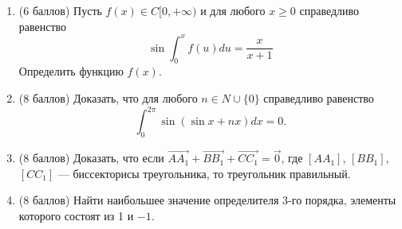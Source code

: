 \begin{enumerate}
\item (6 баллов) Пусть $f(x) \in C[0, +\infty)$ и для любого $x \geqslant 0$ справедливо равенство
$$ \sin \int_{0}^{x} f(u) du = \frac{x}{x+1}$$
Определить функцию $f(x)$.

\item (8 баллов) Доказать, что для любого $n \in N \cup \{0\}$ справедливо равенство $$\int_{0}^{2 \pi} \sin(\sin x + n x) dx = 0.$$

\item (8 баллов) Доказать, что если $\overrightarrow{AA_1} + 
\overrightarrow{BB_1} +
\overrightarrow{CC_1} = \overrightarrow{0}$, где $[AA_1]$, $[BB_1]$, $[CC_1]$ --- биссекторисы треугольника, то треугольник правильный.

\item (8 баллов) Найти наибольшее значение определителя 3-го порядка, элементы которого состоят из 1 и $-1$.
\end{enumerate}